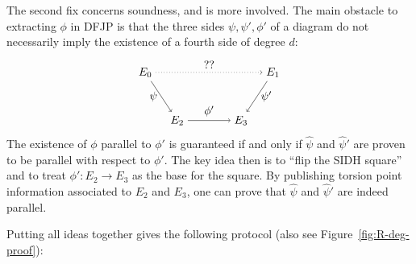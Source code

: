 The second fix concerns soundness, and is more involved.
The main obstacle to extracting $\phi$ in DFJP is that the three sides $\psi,\psi',\phi'$ of a diagram do not necessarily imply the existence of a fourth side of degree $d$:
%
\begin{equation*}
    \tikz[x=2cm,y=-1.5cm]{
    \node (E0) at (-0.5,0) {$E_0$};
    \node (E1) at (1.5,0) {$E_1$};
    \node (E2) at (0,1) {$E_2$};
    \node (E3) at (1,1) {$E_3$};
    \draw[->] (E0) edge[dotted] node[above] {??} (E1)
    (E0) edge node[left] {$\psi$} (E2)
    (E1) edge node[right] {$\psi'$} (E3)
    (E2) edge node[above] {$\phi'$} (E3);
    }
\end{equation*}
%
The existence of $\phi$ parallel to $\phi'$ is guaranteed if and only if $\widehat\psi$ and $\widehat\psi'$ are proven to be parallel with respect to $\phi'$.
The key idea then is to ``flip the SIDH square'' and to treat $\phi':E_2\to E_3$ as the base for the square.
By publishing torsion point information associated to $E_2$ and $E_3$, one can prove that $\widehat\psi$ and $\widehat\psi'$ are indeed parallel.

Putting all ideas together gives the following protocol (also see Figure~\ref{fig:R-deg-proof}):


